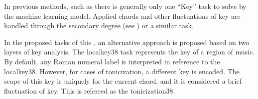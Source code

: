 
In previous methods, such as \textcite{chen2018functional,
chen2019harmony, micchi2020not, micchi2021deep,
mcleod2021modular} there is generally only one ``Key'' task
to solve by the machine learning model. Applied chords and
other fluctuations of key are handled through the secondary
degree (see ) or a similar
task.

In the proposed tasks of this \thesisdiss{}, an alternative
approach is proposed based on two layers of key analysis.
The \gls{localkey38} task represents the key of a region of
music. By default, any Roman numeral label is interpreted in
reference to the \gls{localkey38}. However, for cases of
tonicization, a different key is encoded. The scope of this
key is uniquely for the current chord, and it is considered
a brief fluctuation of key. This is referred as the
\gls{tonicization38}.
